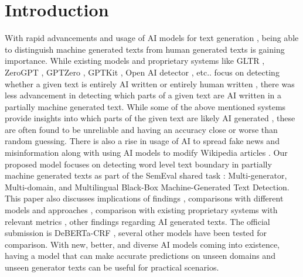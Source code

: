 \documentclass[11pt]{article}
\begin{document}
\section{Introduction}
With rapid advancements and usage of AI models for text generation , being able to distinguish machine generated texts from human generated texts is gaining importance. While existing models and proprietary systems like GLTR \cite{DBLP:journals/corr/abs-1906-04043}, ZeroGPT \cite{AITextDetector}, GPTZero \cite{tian2023gptzero}, GPTKit \cite{gptkit}, Open AI detector , etc.. focus on detecting whether a given text is entirely AI written or entirely human written , there was less advancement in detecting which parts of a given text are AI written in a partially machine generated text. While some of the above mentioned systems provide insights into which parts of the given text are likely AI generated , these are often found to be unreliable and having an accuracy close or worse than random guessing. There is also a rise in usage of AI to spread fake news and misinformation along with using AI models to modify Wikipedia articles \cite{vice2023aiwikipedia}. Our proposed model focuses on detecting word level text boundary in partially machine generated texts as part of the SemEval shared task : Multi-generator, Multi-domain, and Multilingual Black-Box Machine-Generated Text Detection\cite{wang-EtAl:2024:SemEval20245}. This paper also discusses implications of findings , comparisons with different models and approaches , comparison with existing proprietary systems with relevant metrics , other findings regarding AI generated texts. The official submission is DeBERTa-CRF , several other models have been tested for comparison. With new, better, and diverse AI models coming into existence, having a model that can make accurate predictions on unseen domains and unseen generator texts can be useful for practical scenarios. 
\end{document}

